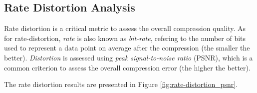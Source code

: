\subsection{Rate Distortion Analysis}

Rate distortion is a critical metric to assess the overall compression quality. As for rate-distortion, \emph{rate} is also known as \emph{bit-rate}, refering to the number of bits used to represent a data point on average after the compression (the smaller the better). \emph{Distortion} is assessed using \emph{peak signal-to-noise ratio} (PSNR), which is a common criterion to assess the overall compression error (the higher the better).

The rate distortion results are presented in Figure \ref{fig:rate-distortion_psnr}.

